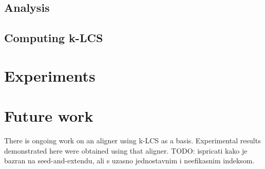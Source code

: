 \documentclass[11pt]{article} %
\begin{document}
\subsection{Analysis}

\subsection{Computing k-LCS}

\section{Experiments}

\section{Future work}

There is ongoing work on an aligner using k-LCS as a basis. Experimental results demonstrated here were obtained using that aligner. TODO: ispricati kako je bazran na seed-and-extendu, ali s uzasno jednostavnim i neefikasnim indeksom.
\end{document}

